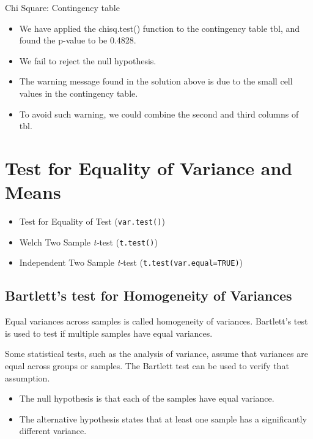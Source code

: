 {Chi Square: Contingency table}
\begin{itemize}
	\item We have applied the chisq.test() function to the contingency table tbl, and found the p-value to be 0.4828.
	\item We fail to reject the null hypothesis.
	
	
	\item The warning message found in the solution above is due to the small cell values in the contingency table. \item To avoid such warning, we could combine the second and third columns of tbl.
\end{itemize}




\section{Test for Equality of Variance and Means}

\begin{itemize}
\item Test for Equality of Test (\texttt{var.test()})
\item Welch Two Sample \emph{t-}test (\texttt{t.test()})
\item Independent Two Sample \emph{t-}test (\texttt{t.test(var.equal=TRUE)})

\end{itemize}

\subsection{Bartlett's test for Homogeneity of Variances}
 

Equal variances across samples is called homogeneity of variances. Bartlett's test is used to test if multiple samples have equal variances. 

Some statistical tests, such as the analysis of variance, assume that variances are equal across groups or samples.  The Bartlett test can be used to verify that assumption.

\begin{itemize}
\item The null hypothesis is that each of the samples have equal variance.
\item The alternative hypothesis states that at least one sample has a significantly different variance.
\end{itemize}

